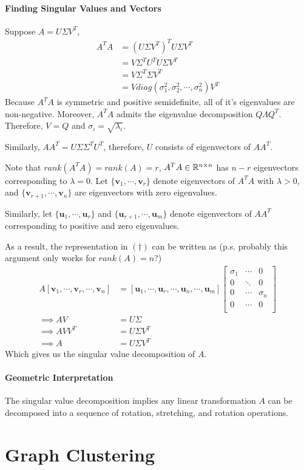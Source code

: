 \documentclass[11pt]{article}
\begin{document}
	\paragraph{Finding Singular Values and Vectors}
	Suppose $A = U \Sigma V^T$,
	\begin{align}
		A^T A &= (U \Sigma V^T)^T U \Sigma V^T \\
		&= V \Sigma^T U^T U \Sigma V^T \\
		&= V \Sigma^T \Sigma V^T \\
		&= V diag(\sigma_1^2, \sigma_2^2, \cdots, \sigma_n^2) V^T
	\end{align}
	Because $A^T A$ is symmetric and positive semidefinite, all of it's eigenvalues are non-negative. Moreover, $A^TA$ admits the eigenvalue decomposition $Q \Lambda Q^T$. Therefore, $V = Q$ and $\sigma_i = \sqrt{\lambda_i}$.
	
	Similarly, $A A^T = U \Sigma \Sigma^T U^T$, therefore, $U$ consists of eigenvectors of $A A^T$.
	
	Note that $rank(A^TA) = rank(A) = r$, $A^T A \in \mathbb{R}^{n \times n}$ has $n - r$ eigenvectors corresponding to $\lambda = 0$.
	Let $\{\mathbf{v}_1, \cdots, \mathbf{v}_r\}$ denote eigenvectors of $A^TA$ with $\lambda > 0$, and $\{\mathbf{v}_{r+1}, \cdots, \mathbf{v}_{n}\}$ are eigenvectors with zero eigenvalues.
	
	Similarly, let $\{\mathbf{u}_1, \cdots, \mathbf{u}_r\}$ and $\{\mathbf{u}_{r+1}, \cdots, \mathbf{u}_m\}$ denote eigenvectors of $AA^T$ corresponding to positive and zero eigenvalues.

	As a result, the representation in $(\dagger)$ can be written as (p.s. probably this argument only works for $rank(A) = n$?)
	\begin{align}
		A [\mathbf{v}_1, \cdots, \mathbf{v}_r, \cdots, \mathbf{v}_n] &= [\mathbf{u}_1, \cdots, \mathbf{u}_r, \cdots, \mathbf{u}_n, \cdots, \mathbf{u}_m] \begin{bmatrix}
			\sigma_1 & \cdots & 0 \\
			0 & \ddots & 0 \\
			0 & \cdots & \sigma_n \\
			0 & \cdots & 0 \\
		\end{bmatrix} \\
		\implies A V &= U \Sigma \\
		\implies A V V^T &= U \Sigma V^T \\
		\implies A &= U \Sigma V^T
	\end{align}
	Which gives us the singular value decomposition of $A$.
	\paragraph{Geometric Interpretation}
	The singular value decomposition implies any linear transformation $A$ can be decomposed into a sequence of rotation, stretching, and rotation operations.
	\section{Graph Clustering}
\end{document}
